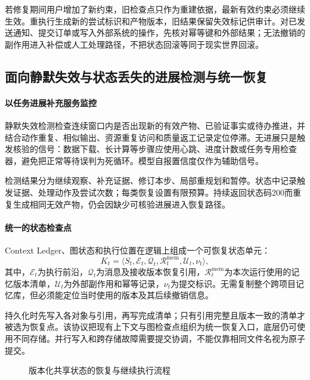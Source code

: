 若修复期间用户增加了新约束，旧检查点只作为重建依据，最新有效约束必须继续生效。重执行生成新的尝试标识和产物版本，旧结果保留失效标记供审计。对已发送通知、提交订单或写入外部系统的操作，先核对幂等键和外部结果；无法撤销的副作用进入补偿或人工处理路径，不把状态回滚等同于现实世界回滚。

\subsection{面向静默失效与状态丢失的进展检测与统一恢复}

\paragraph{以任务进展补充服务监控}
静默失效检测检查连续窗口内是否出现新的有效产物、已验证事实或待办推进，并结合动作重复、相似输出、资源重复访问和质量返工记录定位停滞。无进展只是触发核验的信号：数据下载、长计算等步骤应使用心跳、进度计数或任务专用检查器，避免把正常等待误判为死循环。模型自报置信度仅作为辅助信号。

检测结果分为继续观察、补充证据、修订本步、局部重规划和暂停。状态中记录触发证据、处理动作及尝试次数；每类恢复设置有限预算。持续返回状态码200而重复生成相同无效产物，仍会因缺少可核验进展进入恢复路径。

\paragraph{统一的状态检查点}
Context Ledger、图状态和执行位置在逻辑上组成一个可恢复状态单元：
\begin{equation}
K_t=\langle S_t,\mathcal{E}_t,\mathcal{Q}_t,
\mathcal{R}_t^{\mathrm{mem}},\mathcal{U}_t,\nu_t\rangle,
\end{equation}
其中，$\mathcal{E}_t$为执行前沿，$\mathcal{Q}_t$为消息及接收版本恢复引用，$\mathcal{R}_t^{\mathrm{mem}}$为本次运行使用的记忆版本清单，$\mathcal{U}_t$为外部副作用和幂等记录，$\nu_t$为提交标识。无需复制整个跨项目记忆库，但必须能定位当时使用的版本及其后续撤销信息。

持久化时先写入各对象与引用，再写完成清单；只有引用完整且版本一致的清单才被选为恢复点。该协议把现有上下文与图检查点组织为统一恢复入口，底层仍可使用不同存储。并行写入和跨存储故障需要提交协调，不能仅靠相同文件名视为原子提交。

\begin{figure}[htbp]
\centering
{}
\caption{版本化共享状态的恢复与继续执行流程}
\label{fig:anchor_recovery}
\end{figure}

